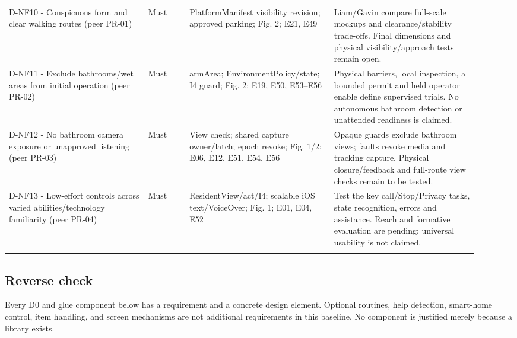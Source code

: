 \documentclass[12pt,letterpaper]{article}
\begin{document}
\begin{longtable}{@{}>{\RaggedRight\arraybackslash}p{0.27\linewidth}>{\RaggedRight\arraybackslash}p{0.08\linewidth}>{\RaggedRight\arraybackslash}p{0.28\linewidth}>{\RaggedRight\arraybackslash}p{0.285\linewidth}@{}}
D-NF10 - Conspicuous form and clear walking routes (peer PR-01) & Must & PlatformManifest visibility revision; approved parking; Fig. 2; E21, E49 & Liam/Gavin compare full-scale mockups and clearance/stability trade-offs. Final dimensions and physical visibility/approach tests remain open. \\ \addlinespace[3pt]
D-NF11 - Exclude bathrooms/wet areas from initial operation (peer PR-02) & Must & armArea; EnvironmentPolicy/state; I4 guard; Fig. 2; E19, E50, E53--E56 & Physical barriers, local inspection, a bounded permit and held operator enable define supervised trials. No autonomous bathroom detection or unattended readiness is claimed. \\ \addlinespace[3pt]
D-NF12 - No bathroom camera exposure or unapproved listening (peer PR-03) & Must & View check; shared capture owner/latch; epoch revoke; Fig. 1/2; E06, E12, E51, E54, E56 & Opaque guards exclude bathroom views; faults revoke media and tracking capture. Physical closure/feedback and full-route view checks remain to be tested. \\ \addlinespace[3pt]
D-NF13 - Low-effort controls across varied abilities/technology familiarity (peer PR-04) & Must & ResidentView/act/I4; scalable iOS text/VoiceOver; Fig. 1; E01, E04, E52 & Test the key call/Stop/Privacy tasks, state recognition, errors and assistance. Reach and formative evaluation are pending; universal usability is not claimed. \\ \addlinespace[3pt]
\end{longtable}\endgroup

\subsection*{Reverse check}
Every D0 and glue component below has a requirement and a concrete design element. Optional routines, help detection, smart-home control, item handling, and screen mechanisms are not additional requirements in this baseline. No component is justified merely because a library exists.
\end{document}
